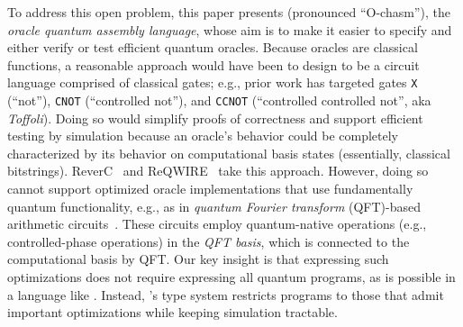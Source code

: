  To address this open problem, this paper presents \oqasm (pronounced
``O-chasm''), the \emph{oracle quantum assembly language}, 
whose aim is to make it easier to specify and either verify or test
efficient quantum oracles.
%
%
Because oracles are
classical functions, a reasonable approach would have been to design
\oqasm to be a circuit language comprised of classical gates; e.g.,
prior work has targeted gates \texttt{X} (``not''), \texttt{CNOT}
(``controlled not''), and \texttt{CCNOT} (``controlled controlled
not'', aka \emph{Toffoli}). Doing so would simplify proofs of
correctness and support efficient testing by simulation
because an oracle's behavior could be completely characterized by
its behavior on computational basis states (essentially, classical bitstrings). 
ReverC~\cite{reverC} and ReQWIRE~\cite{Rand2018ReQWIRERA} take
this approach. However, doing so cannot support optimized oracle
implementations that use fundamentally quantum functionality, e.g., as
in \emph{quantum Fourier transform} (QFT)-based arithmetic
circuits~\cite{qft-adder,2000quant}.
These circuits employ
quantum-native operations (e.g., controlled-phase operations) in the
\emph{QFT basis}, which is connected to the computational basis by QFT\@.
Our key insight is that expressing such optimizations does not require expressing
all quantum programs, as is possible in a language like \sqir. Instead,
\oqasm's type system restricts programs to those that admit
important optimizations while keeping simulation tractable. 



